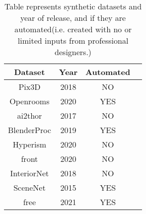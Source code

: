 \begin{table}[ht]
    \centering
    \begin{tabular}{|c |c |c |c|}
        \hline
        Dataset & Year & Automated \\ [0.5ex]
        \hline\hline
        Pix3D & 2018 & NO \\
        \hline
        Openrooms & 2020 & YES \\
        \hline
        \gls{ai2thor} & 2017 & NO \\
        \hline
        BlenderProc & 2019 & YES \\
        \hline
        Hyperism & 2020 & NO \\
        \hline
        \gls{front} & 2020 & NO \\
        \hline
        InteriorNet & 2018 & NO \\
        \hline
        SceneNet & 2015 & YES \\
        \hline
        \gls{free} & 2021 & YES \\[1ex]
        \hline
    \end{tabular}
    \caption{Table represents synthetic datasets and year of release, and if they are automated(i.e. created with no or limited inputs from professional designers.)}
    \label{tab:dataset_comparison}
\end{table}


